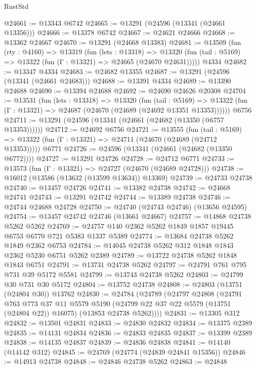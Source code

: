 \begin{lexlean}{RustStd}
\begin{coremodule}
@24661 := @13343 @6742
@24665 := @13291 (@24596 (@13341 (@24661 @13356)))
@24666 := @13378 @6742
@24667 := @24621 @24666
@24668 := @13362 @24667
@24670 := @13291 (@24668 @13383)
@24681 := @13509
    (fun (rty : @4160) =>
    @13319
      (fun (lets : @13318) =>
      @13320 (fun (tail : @5169) => @13322 (fun (Γ : @13321) => @24665 (@24670 @24631)))))
    @4334
@24682 := @13347 @4334
@24683 := @24682 @13355
@24687 := @13291 (@24596 (@13341 (@24661 @24683)))
@24688 := @13391 @4334
@24689 := @13390 @24688
@24690 := @13394 @24688
@24692 := @24690 @24626 @20308
@24704 := @13531
    (fun (lets : @13318) =>
    @13320
      (fun (tail : @5169) =>
      @13322 (fun (Γ : @13321) => @24687 (@24670 (@24689 (@24692 @13351 @13353))))))
    @6756
@24711 := @13291 (@24596 (@13341 (@24661 (@24682 (@13350 (@6757 @13353))))))
@24712 := @24692 @6756
@24721 := @13555
    (fun (tail : @5169) => @13322 (fun (Γ : @13321) => @24711 (@24670 (@24689 (@24712 @13353)))))
    @6771
@24726 := @24596 (@13341 (@24661 (@24682 (@13350 @6772))))
@24727 := @13291 @24726
@24728 := @24712 @6771
@24733 := @13573 (fun (Γ : @13321) => @24727 (@24670 (@24689 @24728)))
@24738 := @16012 (@13586 (@13632 (@13599 @13634)) @13369)
@24739 := @24733 @24738
@24740 := @13457 @24726
@24741 := @13382 @24738
@24742 := @24668 @24741
@24743 := @13291 @24742
@24744 := @13389 @24738
@24746 := @24744 @24688 @24728
@24750 := @24740 (@24743 @24746) (@13656 @24595)
@24754 := @13457 @24742 @24746 (@13661 @24667)
@24757 := @14868 @24738 @5262 @5262
@24769 := @24757 @140 @2362 @5262 @1849 @1857 @19445 @6753 @6770 @721 @5383 @1337 @5389
@24774 := @13684 @24738 @5262 @1849 @2362 @6753
@24784 := @14045 @24738 @5262 @312 @1848 @1843 @2362 @5230 @6751 @5262 @2389
@24789 := @13722 @24738 @5262 @1848 @1843 @6751
@24791 := @13731 @24738 @5262
@24797 := @24791 @761 @795 @731 @39 @5172 @5581
@24799 := @13743 @24738 @5262
@24803 := @24799 @30 @731 @30 @5172
@24804 := @13752 @24738
@24808 := @24803 (@13751 (@24804 @30)) @13762
@24830 := @24784
    (@24789
      (@24797
        @24808
        (@24791
          @763
          @773
          @37
          @11
          @5579
          @5190
          (@24799 @22 @37 @22 @5579 (@13751 (@24804 @22)) @16075)
          (@13853 @24738 @5262))))
@24831 := @13305 @312
@24832 := @13501 @24831
@24833 := @24830 @24832
@24834 := @13375 @2389
@24835 := @14131 @24834
@24836 := @24833 @24835
@24837 := @13399 @2389
@24838 := @14135 @24837
@24839 := @24836 @24838
@24841 := @14140 (@14142 @312)
@24845 := @24769 (@24774 (@24839 @24841 @15356))
@24846 := @14913 @24738
@24848 := @24846 @24738 @5262
@24863 := @24848

\end{coremodule}
\end{lexlean}
